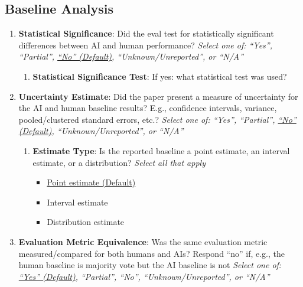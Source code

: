 \documentclass{article}
\begin{document}
\subsection{Baseline Analysis}

\renewcommand{\labelenumi}{4.\arabic{enumi}}
\renewcommand{\labelenumii}{4.\arabic{enumi}.\arabic{enumii}}
\renewcommand{\labelenumiii}{4.\arabic{enumi}.\arabic{enumii}.\arabic{enumiii}}

\begin{enumerate}[leftmargin=30pt, topsep=0pt, itemsep=0pt]
    \item \textbf{Statistical Significance}: Did the eval test for statistically significant differences between AI and human performance?
    \newline \textit{Select one of: ``Yes'', ``Partial'', \ul{``No'' (Default)}, ``Unknown/Unreported'', or ``N/A''}
    \begin{enumerate}
        \item \textbf{Statistical Significance Test}: If yes: what statistical test was used?
    \end{enumerate}
    
    \item \textbf{Uncertainty Estimate}: Did the paper present a measure of uncertainty for the AI and human baseline results? E.g., confidence intervals, variance, pooled/clustered standard errors, etc.?
    \newline \textit{Select one of: ``Yes'', ``Partial'', \ul{``No'' (Default)}, ``Unknown/Unreported'', or ``N/A''}
    \begin{enumerate}
        \item \textbf{Estimate Type}: Is the reported baseline a point estimate, an interval estimate, or a distribution?
        \newline \textit{Select all that apply}
        \begin{itemize}
            \item \ul{Point estimate (Default)}
            \item Interval estimate
            \item Distribution estimate
        \end{itemize}
    \end{enumerate}
    
    \item \textbf{Evaluation Metric Equivalence}: Was the same evaluation metric measured/compared for both humans and AIs? Respond ``no'' if, e.g., the human baseline is majority vote but the AI baseline is not
    \newline \textit{Select one of: \ul{``Yes'' (Default)}, ``Partial'', ``No'', ``Unknown/Unreported'', or ``N/A''}
    

\end{enumerate}
\end{document}
